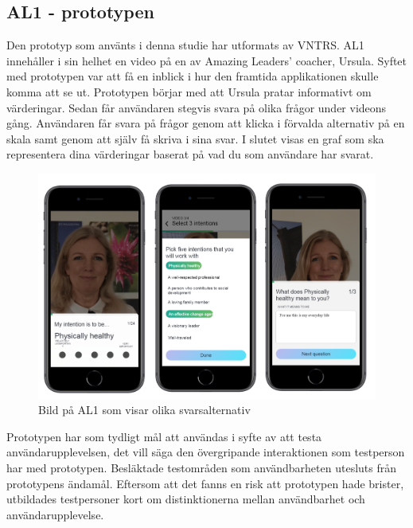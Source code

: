 \subsection{AL1 - prototypen}
Den prototyp som använts i denna studie har utformats av VNTRS. AL1 innehåller i sin helhet en video på en av Amazing Leaders' coacher, Ursula. Syftet med prototypen var att få en inblick i hur den framtida applikationen skulle komma att se ut. Prototypen börjar med att Ursula pratar informativt om värderingar. Sedan får användaren stegvis svara på olika frågor under videons gång. Användaren får svara på frågor genom att klicka i förvalda alternativ på en skala samt genom att själv få skriva i sina svar. I slutet visas en graf som ska representera dina värderingar baserat på vad du som användare har svarat.
\newline

\begin{figure} [H] 
  \centering
  \includegraphics[scale=0.3]{AL1.png}
\centering
\captionsetup{justification=centering,margin=2cm}
\caption{Bild på AL1 som visar olika svarsalternativ}
\end{figure} 
Prototypen har som tydligt mål att användas i syfte av att testa användarupplevelsen, det vill säga den övergripande interaktionen som testperson har med prototypen. Besläktade testområden som användbarheten utesluts från prototypens ändamål. Eftersom att det fanns en risk att prototypen hade brister, utbildades testpersoner kort om distinktionerna mellan användbarhet och användarupplevelse. 
\newline

